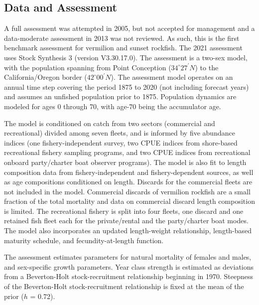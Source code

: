 \documentclass[11pt,
  english,
]{article}
\begin{document}
\FloatBarrier


\hypertarget{data-and-assessment}{%
\subsection*{Data and Assessment}\label{data-and-assessment}}

\leavevmode\tagmcend\tagstructend

A full assessment was attempted in 2005, but not accepted for management and a data-moderate assessment in 2013 was not reviewed. As such, this is the first benchmark assessment for vermilion and sunset rockfish. The 2021 assessment uses Stock Synthesis 3 (version V3.30.17.0). The assessment is a two-sex model, with the population spanning from Point Conception ($34^\circ 27^\prime N$) to the California/Oregon border ($42^\circ 00^\prime N$). The assessment model operates on an annual time step covering the period 1875 to 2020 (not including forecast years) and assumes an unfished population prior to 1875. Population dynamics are modeled for ages 0 through 70, with age-70 being the accumulator age.

The model is conditioned on catch from two sectors (commercial and recreational) divided among seven fleets, and is informed by five abundance indices (one fishery-independent survey, two CPUE indices from shore-based recreational fishery sampling programs, and two CPUE indices from recreational onboard party/charter boat observer programs). The model is also fit to length composition data from fishery-independent and fishery-dependent sources, as well as age compositions conditioned on length. Discards for the commercial fleets are not included in the model. Commercial discards of vermilion rockfish are a small fraction of the total mortality and data on commercial discard length composition is limited. The recreational fishery is split into four fleets, one discard and one retained fish fleet each for the private/rental and the party/charter boat modes. The model also incorporates an updated length-weight relationship, length-based maturity schedule, and fecundity-at-length function.

The assessment estimates parameters for natural mortality of females and males, and sex-specific growth parameters. Year class strength is estimated as deviations from a Beverton-Holt stock-recruitment relationship beginning in 1970. Steepness of the Beverton-Holt stock-recruitment relationship is fixed at the mean of the prior ({\(h\)\leavevmode\tagmcend\tagstructend} = 0.72).
\end{document}
